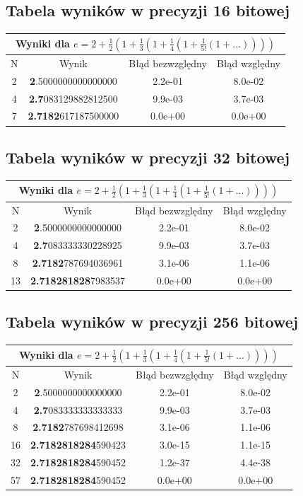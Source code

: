 \documentclass{article}
\begin{document}
\subsection{Tabela wyników w precyzji 16 bitowej}
\begin{tabular}{||c||c|c|c||} \hline
\multicolumn{4}{||c||}{Wyniki dla $e = 2 + \frac{1}{2}(1 + \frac{1}{3}(1+ \frac{1}{4}(1 + \frac{1}{5!}(1 + ...))))$} \\ \hline
N & Wynik & Błąd bezwzględny & Błąd względny\\ \hline
2 & \textbf{2}.5000000000000000  & 2.2e-01  & 8.0e-02\\
\hline
4 & \textbf{2.7}083129882812500  & 9.9e-03  & 3.7e-03\\
\hline
7 & \textbf{2.7182}617187500000  & 0.0e+00  & 0.0e+00\\
\hline
\end{tabular}
\subsection{Tabela wyników w precyzji 32 bitowej}
\begin{tabular}{||c||c|c|c||} \hline
\multicolumn{4}{||c||}{Wyniki dla $e = 2 + \frac{1}{2}(1 + \frac{1}{3}(1+ \frac{1}{4}(1 + \frac{1}{5!}(1 + ...))))$} \\ \hline
N & Wynik & Błąd bezwzględny & Błąd względny\\ \hline
2 & \textbf{2}.5000000000000000  & 2.2e-01  & 8.0e-02\\
\hline
4 & \textbf{2.7}083333330228925  & 9.9e-03  & 3.7e-03\\
\hline
8 & \textbf{2.7182}787694036961  & 3.1e-06  & 1.1e-06\\
\hline
13 & \textbf{2.718281828}7983537  & 0.0e+00  & 0.0e+00\\
\hline
\end{tabular}
\subsection{Tabela wyników w precyzji 256 bitowej}
\begin{tabular}{||c||c|c|c||} \hline
\multicolumn{4}{||c||}{Wyniki dla $e = 2 + \frac{1}{2}(1 + \frac{1}{3}(1+ \frac{1}{4}(1 + \frac{1}{5!}(1 + ...))))$} \\ \hline
N & Wynik & Błąd bezwzględny & Błąd względny\\ \hline
2 & \textbf{2}.5000000000000000  & 2.2e-01  & 8.0e-02\\
\hline
4 &  \textbf{2.7}083333333333333  & 9.9e-03  & 3.7e-03\\
\hline
8 & \textbf{2.7182}787698412698  & 3.1e-06  & 1.1e-06\\
\hline
16 & \textbf{2.7182818284}590423  & 3.0e-15  & 1.1e-15\\
\hline
32 & \textbf{2.7182818284}590452  & 1.2e-37  & 4.4e-38\\
\hline
57 & \textbf{2.7182818284}590452  & 0.0e+00  & 0.0e+00\\
\hline
\end{tabular}
\end{document}
